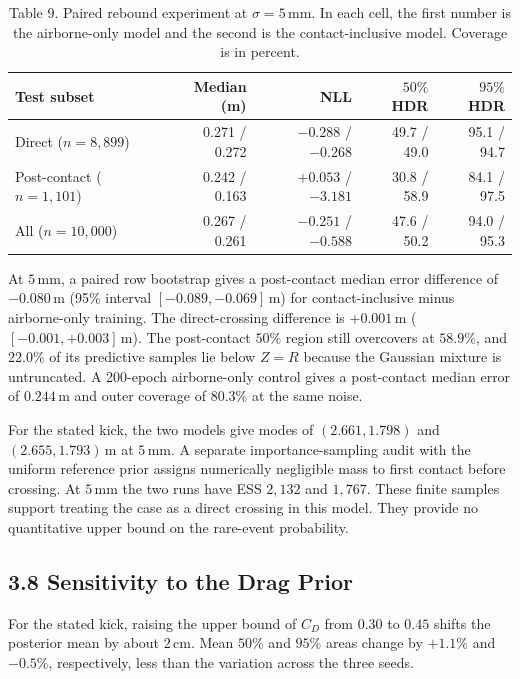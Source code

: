 \begin{table}[htbp]
  
  
  \caption{Table 9. Paired rebound experiment at $\sigma=5\,\mathrm{mm}$. In each cell, the first number is the airborne-only model and the second is the contact-inclusive model. Coverage is in percent.}
  \begin{tabular}{lrrrr}
    \toprule
    Test subset & Median (m) & NLL & $50\%$ HDR & $95\%$ HDR \\
    \midrule
    Direct ($n=8{,}899$) & 0.271 / 0.272 & $-0.288$ / $-0.268$ & 49.7 / 49.0 & 95.1 / 94.7 \\
    Post-contact ($n=1{,}101$) & 0.242 / 0.163 & $+0.053$ / $-3.181$ & 30.8 / 58.9 & 84.1 / 97.5 \\
    All ($n=10{,}000$) & 0.267 / 0.261 & $-0.251$ / $-0.588$ & 47.6 / 50.2 & 94.0 / 95.3 \\
    \bottomrule
  \end{tabular}
\end{table}

At $5\,\mathrm{mm}$, a paired row bootstrap gives a post-contact median error difference of $-0.080\,\mathrm{m}$ (95\% interval $[-0.089,-0.069]\,\mathrm{m}$) for contact-inclusive minus airborne-only training. The direct-crossing difference is $+0.001\,\mathrm{m}$ ($[-0.001,+0.003]\,\mathrm{m}$). The post-contact $50\%$ region still overcovers at $58.9\%$, and $22.0\%$ of its predictive samples lie below $Z=R$ because the Gaussian mixture is untruncated. A 200-epoch airborne-only control gives a post-contact median error of $0.244\,\mathrm{m}$ and outer coverage of $80.3\%$ at the same noise.

For the stated kick, the two models give modes of $(2.661,1.798)$ and $(2.655,1.793)\,\mathrm{m}$ at $5\,\mathrm{mm}$. A separate importance-sampling audit with the uniform reference prior assigns numerically negligible mass to first contact before crossing. At $5\,\mathrm{mm}$ the two runs have ESS $2{,}132$ and $1{,}767$. These finite samples support treating the case as a direct crossing in this model. They provide no quantitative upper bound on the rare-event probability.

\subsection{3.8 Sensitivity to the Drag Prior}

For the stated kick, raising the upper bound of $C_D$ from $0.30$ to $0.45$ shifts the posterior mean by about $2\,\mathrm{cm}$. Mean $50\%$ and $95\%$ areas change by $+1.1\%$ and $-0.5\%$, respectively, less than the variation across the three seeds.

